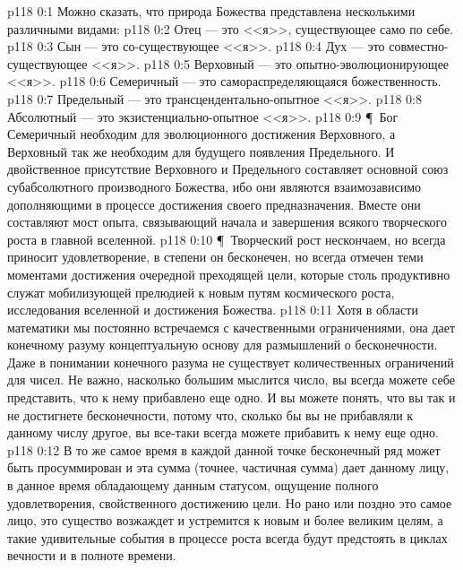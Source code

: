 \vs p118 0:1 Можно сказать, что природа Божества представлена несколькими различными видами:
\vs p118 0:2 \bibnobreakspace Отец --- это <<я>>, существующее само по себе.
\vs p118 0:3 \bibnobreakspace Сын --- это со\hyp{}существующее <<я>>.
\vs p118 0:4 \bibnobreakspace Дух --- это совместно\hyp{}существующее <<я>>.
\vs p118 0:5 \bibnobreakspace Верховный --- это опытно\hyp{}эволюционирующее <<я>>.
\vs p118 0:6 \bibnobreakspace Семеричный --- это самораспределяющаяся божественность.
\vs p118 0:7 \bibnobreakspace Предельный --- это трансцендентально\hyp{}опытное <<я>>.
\vs p118 0:8 \bibnobreakspace Абсолютный --- это экзистенциально\hyp{}опытное <<я>>.
\vs p118 0:9 \P\ Бог Семеричный необходим для эволюционного достижения Верховного, а Верховный так же необходим для будущего появления Предельного. И двойственное присутствие Верховного и Предельного составляет основной союз субабсолютного производного Божества, ибо они являются взаимозависимо дополняющими в процессе достижения своего предназначения. Вместе они составляют мост опыта, связывающий начала и завершения всякого творческого роста в главной вселенной.
\vs p118 0:10 \P\ Творческий рост нескончаем, но всегда приносит удовлетворение, в степени он бесконечен, но всегда отмечен теми моментами достижения очередной преходящей цели, которые столь продуктивно служат мобилизующей прелюдией к новым путям космического роста, исследования вселенной и достижения Божества.
\vs p118 0:11 Хотя в области математики мы постоянно встречаемся с качественными ограничениями, она дает конечному разуму концептуальную основу для размышлений о бесконечности. Даже в понимании конечного разума не существует количественных ограничений для чисел. Не важно, насколько большим мыслится число, вы всегда можете себе представить, что к нему прибавлено еще одно. И вы можете понять, что вы так и не достигнете бесконечности, потому что, сколько бы вы не прибавляли к данному числу другое, вы все\hyp{}таки всегда можете прибавить к нему еще одно.
\vs p118 0:12 В то же самое время в каждой данной точке бесконечный ряд может быть просуммирован и эта сумма (точнее, частичная сумма) дает данному лицу, в данное время обладающему данным статусом, ощущение полного удовлетворения, свойственного достижению цели. Но рано или поздно это самое лицо, это существо возжаждет и устремится к новым и более великим целям, а такие удивительные события в процессе роста всегда будут предстоять в циклах вечности и в полноте времени.
